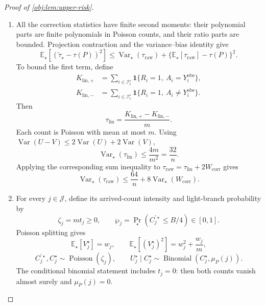 \documentclass[11pt]{article}
\begin{document}
\begin{proof}[Proof of \cref{obj:lem:upper-risk}]
\begin{enumerate}
\item All the correction statistics have finite second moments: their polynomial parts are finite polynomials in Poisson counts, and their ratio parts are bounded. Projection contraction and the variance--bias identity give
\[
\mathbb E_\star[(\widetilde\tau_\star-\tau(P))^2]
\le
\operatorname{Var}_\star(\tau_{\mathrm{raw}})
+\{\mathbb E_\star[\tau_{\mathrm{raw}}]-\tau(P)\}^2.
\]
To bound the first term, define
\[
\begin{aligned}
K_{\mathrm{lin},+}
&=\sum_{i\in\mathcal I_1^\star}
\mathbf1\{R_i=1,\ A_i=Y_i^{\mathrm{obs}}\},\\
K_{\mathrm{lin},-}
&=\sum_{i\in\mathcal I_1^\star}
\mathbf1\{R_i=1,\ A_i\ne Y_i^{\mathrm{obs}}\}.
\end{aligned}
\]
Then
\[
\tau_{\mathrm{lin}}
=\frac{K_{\mathrm{lin},+}-K_{\mathrm{lin},-}}m.
\]
Each count is Poisson with mean at most \(m\). Using
\(\operatorname{Var}(U-V)\le2\operatorname{Var}(U)+2\operatorname{Var}(V)\),
\[
\operatorname{Var}_\star(\tau_{\mathrm{lin}})
\le\frac{4m}{m^2}
=\frac{32}{n}.
\]
Applying the corresponding sum inequality to
\(\tau_{\mathrm{raw}}=\tau_{\mathrm{lin}}+2W_{\mathrm{corr}}\) gives
\[
\operatorname{Var}_\star(\tau_{\mathrm{raw}})
\le\frac{64}{n}
+8\operatorname{Var}_\star(W_{\mathrm{corr}}).
\]

\item For every \(j\in\mathcal J\), define its arrived-count intensity and light-branch probability by
\[
\zeta_j=mt_j\ge0,
\qquad
\wp_j=\Pr_\star(C_j^{\prime\star}\le B/4)\in[0,1].
\]
Poisson splitting gives
\[
\mathbb E_\star[V_j^\star]=w_j,
\qquad
\mathbb E_\star[(V_j^\star)^2]=w_j^2+\frac{w_j}{m},
\]
\[
C_j^{\prime\star},C_j^\star\sim\operatorname{Poisson}(\zeta_j),
\qquad
U_j^\star\mid C_j^\star
\sim\operatorname{Binomial}(C_j^\star,\mu_P(j)).
\]
The conditional binomial statement includes \(t_j=0\): then both counts vanish almost surely and \(\mu_P(j)=0\).


\end{enumerate}
\end{proof}
\end{document}
